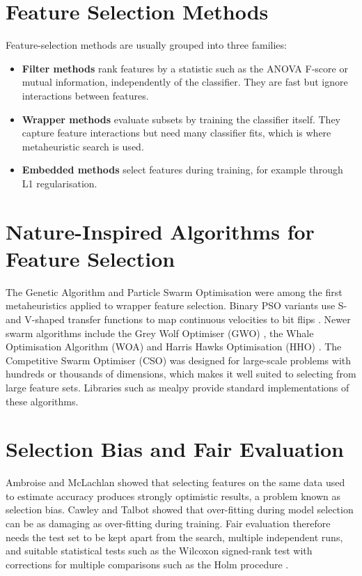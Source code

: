 \documentclass[12pt,a4paper]{report}
\begin{document}
\section{Feature Selection Methods}
Feature-selection methods are usually grouped into three families:
\begin{itemize}
  \item \textbf{Filter methods} rank features by a statistic such as the ANOVA F-score or mutual information,
        independently of the classifier. They are fast but ignore interactions between features.
  \item \textbf{Wrapper methods} evaluate subsets by training the classifier itself. They capture feature
        interactions but need many classifier fits, which is where metaheuristic search is used.
  \item \textbf{Embedded methods} select features during training, for example through L1 regularisation.
\end{itemize}

\section{Nature-Inspired Algorithms for Feature Selection}
The Genetic Algorithm \cite{holland1975} and Particle Swarm Optimisation \cite{kennedy1995} were among the first
metaheuristics applied to wrapper feature selection. Binary PSO variants use S- and V-shaped transfer functions to
map continuous velocities to bit flips \cite{mirjalili2013}. Newer swarm algorithms include the Grey Wolf Optimiser
(GWO) \cite{mirjalili2014}, the Whale Optimisation Algorithm (WOA) \cite{mirjalili2016} and Harris Hawks
Optimisation (HHO) \cite{heidari2019}. The Competitive Swarm Optimiser (CSO) \cite{cheng2015} was designed for
large-scale problems with hundreds or thousands of dimensions, which makes it well suited to selecting from large
feature sets. Libraries such as mealpy \cite{vanthieu2023} provide standard implementations of these algorithms.

\section{Selection Bias and Fair Evaluation}
Ambroise and McLachlan \cite{ambroise2002} showed that selecting features on the same data used to estimate accuracy
produces strongly optimistic results, a problem known as selection bias. Cawley and Talbot \cite{cawley2010} showed
that over-fitting during model selection can be as damaging as over-fitting during training. Fair evaluation
therefore needs the test set to be kept apart from the search, multiple independent runs, and suitable statistical
tests such as the Wilcoxon signed-rank test \cite{wilcoxon1945} with corrections for multiple comparisons such as the
Holm procedure \cite{holm1979}.
\end{document}
